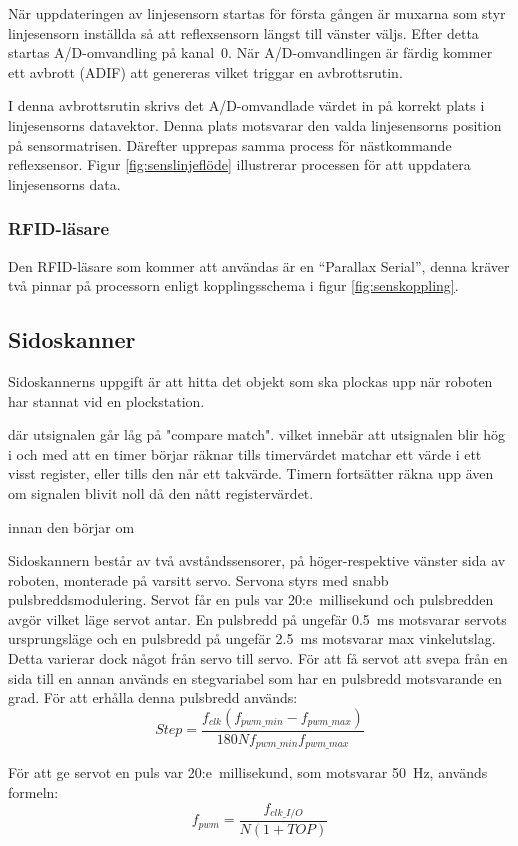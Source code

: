 När uppdateringen av linjesensorn startas för första gången är muxarna som styr linjesensorn inställda så att reflexsensorn längst till vänster väljs. Efter detta startas A/D-omvandling på kanal~0. När A/D-omvandlingen är färdig kommer ett avbrott (ADIF) att genereras vilket triggar en avbrottsrutin.

I denna avbrottsrutin skrivs det A/D-omvandlade värdet in på korrekt plats i linjesensorns datavektor. Denna plats motsvarar den valda linjesensorns position på sensormatrisen. Därefter upprepas samma process för nästkommande reflexsensor. Figur \ref{fig:senslinjeflöde} illustrerar processen för att uppdatera linjesensorns data.

\subsubsection{RFID-läsare}
Den RFID-läsare som kommer att användas är en “Parallax Serial”, denna kräver två pinnar på processorn enligt kopplingsschema i figur \ref{fig:senskoppling}.

\subsection{Sidoskanner}
Sidoskannerns uppgift är att hitta det objekt som ska plockas upp när roboten har stannat vid en plockstation.  

 där utsignalen går låg på "compare match".  vilket innebär att utsignalen blir hög i och med att en timer börjar räknar tills timervärdet matchar ett värde i ett visst register, eller tills den når ett takvärde. Timern fortsätter räkna upp även om signalen blivit noll då den nått registervärdet. 

 innan den börjar om 


Sidoskannern består av två avståndssensorer, på höger-respektive vänster sida av roboten, monterade på varsitt servo. Servona styrs med snabb pulsbreddsmodulering. Servot får en puls var 20:e~millisekund och pulsbredden avgör vilket läge servot antar. En pulsbredd på ungefär 0.5~ms motsvarar servots ursprungsläge och en pulsbredd på ungefär 2.5~ms motsvarar max vinkelutslag. Detta varierar dock något från servo till servo.
För att få servot att svepa från en sida till en annan används en stegvariabel som har en pulsbredd motsvarande en grad. För att erhålla denna pulsbredd används:
$$Step = \frac{f_{clk}(f_{pwm\_min} - f_{pwm\_max})}{180 N f_{pwm\_min} f_{pwm\_max}}$$


För att ge servot en puls var 20:e~millisekund, som motsvarar 50~Hz, används formeln:
$$f_{pwm} = \frac{f_{clk\_I/O}}{N(1 + TOP)}$$

